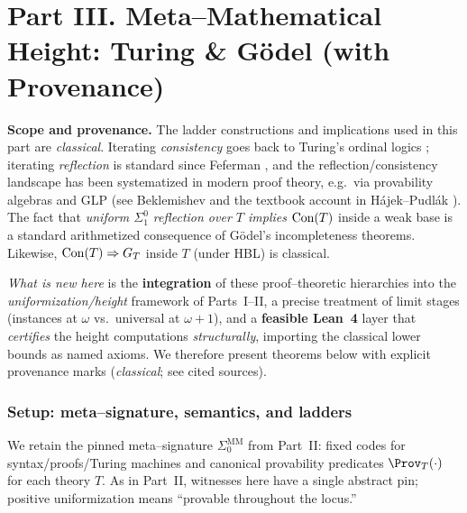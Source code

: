 \documentclass[11pt]{article}
\theoremstyle{definition}
\theoremstyle{remark}
\begin{document}
\part*{Part III. Meta--Mathematical Height: Turing \& G\"odel (with Provenance)}

\begin{mdframed}[style=status]
\textbf{Scope and provenance.}
The ladder constructions and implications used in this part are \emph{classical}.
Iterating \emph{consistency} goes back to Turing's ordinal logics \cite{Turing1939};
iterating \emph{reflection} is standard since Feferman \cite{Feferman1962}, and the
reflection/consistency landscape has been systematized in modern proof theory,
e.g.\ via provability algebras and GLP (see Beklemishev \cite{Beklemishev2003,Beklemishev2004}
and the textbook account in H\'ajek--Pudl\'ak \cite{HajekPudlak}).
The fact that \emph{uniform $\Sigma^0_1$ reflection over $T$ implies $\mathrm{Con}(T)$}
inside a weak base is a standard arithmetized consequence of G\"odel's incompleteness theorems.
Likewise, \(\mathrm{Con}(T)\Rightarrow G_T\) inside \(T\) (under HBL) is classical.
%
\smallskip

\emph{What is new here} is the \textbf{integration} of these proof--theoretic
hierarchies into the \emph{uniformization/height} framework of Parts~I--II,
a precise treatment of limit stages (instances at \(\omega\) vs.\ universal at
\(\omega{+}1\)), and a \textbf{feasible Lean~4} layer that \emph{certifies} the
height computations \emph{structurally}, importing the classical lower bounds as
named axioms. We therefore present theorems below with explicit provenance marks
(\emph{classical}; see cited sources).
\end{mdframed}

\section{Setup: meta--signature, semantics, and ladders}

We retain the pinned meta--signature \(\Sigma_0^{\mathrm{MM}}\) from Part~II:
fixed codes for syntax/proofs/Turing machines and canonical provability predicates
\(\Prov_T(\cdot)\) for each theory \(T\). As in Part~II, witnesses here have a single
abstract pin; positive uniformization means ``provable throughout the locus.''
\end{document}
